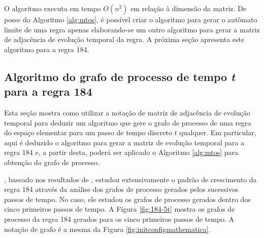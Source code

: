 \documentclass[12pt,a4paper]{article}
\begin{document}
O algoritmo executa em tempo $O(n^2)$ em relação à dimensão da matriz.
De posse do Algoritmo \ref{alg:mtos}, é possível criar o algoritmo para gerar o
autômato limite de uma regra apenas elaborando-se um outro algoritmo para gerar a
matriz de adjacência de evolução temporal da regra. A próxima seção apresenta este
algoritmo para a regra 184.

\subsection{Algoritmo do grafo de processo de tempo \emph{t} para a regra 184}\label{sec:184}

Esta seção mostra como utilizar a notação de matriz de adjacência
de evolução temporal para deduzir um algoritmo que gere o grafo de processo de uma
regra do espaço elementar para um passo de tempo discreto $t$ qualquer. Em
particular, aqui é deduzido o algoritmo para gerar a matriz de evolução temporal para
a regra 184 e, a partir desta, poderá ser aplicado o Algoritmo \ref{alg:mtos}
para obtenção do grafo de processo.

, baseado nos resultados de ,
estudou extensivamente o padrão de crescimento da regra 184 através da análise
dos grafos de processo gerados pelos sucessivos passos de tempo. No caso, ele estudou
os grafos de processo gerados dentro dos cinco primeiros passos de tempo. A Figura
\ref{fig:184-5t} mostra os grafos de processo da regra 184 gerados para os cinco
primeiros passos de tempo. A notação de grafo é a mesma da Figura
\ref{fig:initconfigmathematica}.
\end{document}
